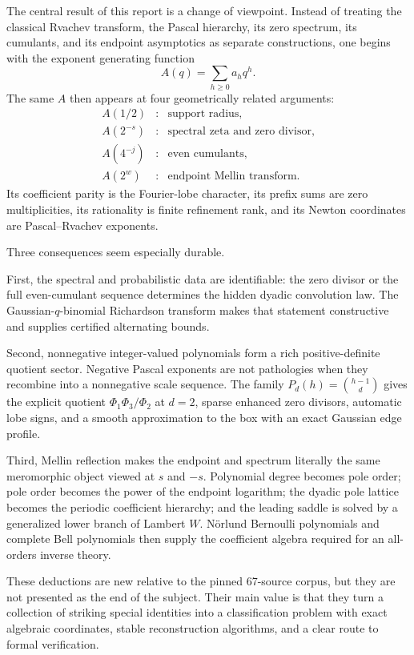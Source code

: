 \documentclass[11pt,oneside]{article}
\numberwithin{equation}{section}
\theoremstyle{definition}
\theoremstyle{remark}
\begin{document}
The central result of this report is a change of viewpoint.  Instead of treating the
classical Rvachev transform, the Pascal hierarchy, its zero spectrum, its cumulants, and its
endpoint asymptotics as separate constructions, one begins with the exponent generating
function
\[
 A(q)=\sum_{h\ge0}a_hq^h.
\]
The same $A$ then appears at four geometrically related arguments:
\begin{equation}
 \begin{array}{ccl}
 A(1/2) &:& \text{support radius},\\
 A(2^{-s}) &:& \text{spectral zeta and zero divisor},\\
 A(4^{-j}) &:& \text{even cumulants},\\
 A(2^w) &:& \text{endpoint Mellin transform}.
 \end{array}
 \label{eq:four-samples-summary}
\end{equation}
Its coefficient parity is the Fourier-lobe character, its prefix sums are zero
multiplicities, its rationality is finite refinement rank, and its Newton coordinates are
Pascal--Rvachev exponents.

Three consequences seem especially durable.

First, the spectral and probabilistic data are identifiable: the zero divisor or the full
even-cumulant sequence determines the hidden dyadic convolution law.  The
Gaussian-$q$-binomial Richardson transform makes that statement constructive and supplies
certified alternating bounds.

Second, nonnegative integer-valued polynomials form a rich positive-definite quotient sector.
Negative Pascal exponents are not pathologies when they recombine into a nonnegative scale
sequence.  The family
$P_d(h)=\binom{h-1}{d}$ gives the explicit quotient
$\Phi_1\Phi_3/\Phi_2$ at $d=2$, sparse enhanced zero divisors, automatic lobe signs, and a
smooth approximation to the box with an exact Gaussian edge profile.

Third, Mellin reflection makes the endpoint and spectrum literally the same meromorphic
object viewed at $s$ and $-s$.  Polynomial degree becomes pole order; pole order becomes the
power of the endpoint logarithm; the dyadic pole lattice becomes the periodic coefficient
hierarchy; and the leading saddle is solved by a generalized lower branch of Lambert $W$.
N\"orlund Bernoulli polynomials and complete Bell polynomials then supply the coefficient
algebra required for an all-orders inverse theory.

These deductions are new relative to the pinned 67-source corpus, but they are not presented
as the end of the subject.  Their main value is that they turn a collection of striking
special identities into a classification problem with exact algebraic coordinates, stable
reconstruction algorithms, and a clear route to formal verification.
\end{document}

